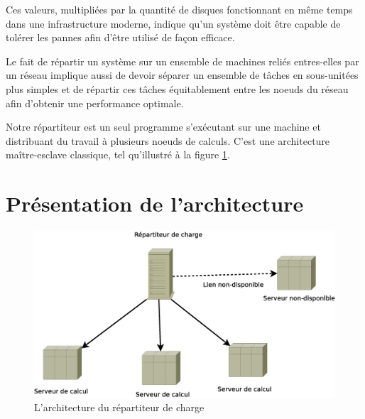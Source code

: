 
Ces valeurs, multipliées par la quantité de disques fonctionnant en même temps dans une infrastructure moderne, indique qu'un système doit
être capable de tolérer les pannes afin d'être utilisé de façon efficace. 

Le fait de répartir un système sur un ensemble de machines reliés entres-elles par un réseau implique aussi de devoir séparer un ensemble de tâches en 
sous-unitées plus simples et de répartir ces tâches équitablement entre les noeuds du réseau afin d'obtenir une performance optimale. 

Notre répartiteur est un seul programme s'exécutant sur une machine et distribuant du travail à plusieurs noeuds de calculs.
C'est une architecture maître-esclave classique, tel qu'illustré à la figure \ref{fig:arch_1}.

\section{Présentation de l'architecture}

\begin{figure}
  \includegraphics[width=\linewidth]{Arch_Trad.eps}
  \caption{L'architecture du répartiteur de charge}
  \label{fig:arch_1}
\end{figure}


